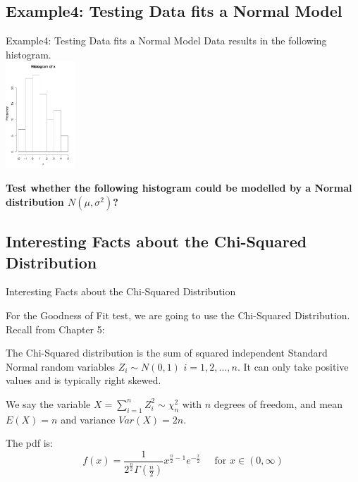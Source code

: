 \documentclass[t,xcolor=pdftex,dvipsnames,table]{beamer}
\begin{document}
\subsection[GoodnessofFit]{Example4: Testing Data fits a Normal Model}
\begin{frame}[fragile]{Example4: Testing Data fits a Normal Model}
Data results in the following histogram. \\



\includegraphics[height=4cm]{../images/Topic11_Q2.pdf}

\vspace{.5cm}
{\bf Test whether the following histogram could be modelled by a Normal distribution $N(\mu, \sigma^2)$?}
\end{frame}

\subsection[GoodnessofFit]{Interesting Facts about the Chi-Squared Distribution}

\begin{frame}[fragile]{Interesting Facts about the Chi-Squared Distribution}

For the Goodness of Fit test, we are going to use the 
Chi-Squared Distribution. Recall from Chapter 5:

\begin{definition}
The \alert{Chi-Squared distribution} is the sum of squared independent Standard Normal random variables $Z_{i} \sim N(0,1)$ $i=1,2,\ldots,n$. It can only take positive values and is typically right skewed.

\vspace{.5cm}
We say the variable $X = \sum_{i=1}^{n} Z_{i}^2 \sim \chi^2_{n}$ with $n$ degrees of freedom, and mean $E(X)=n$ and  variance $Var(X) = 2n$.

\vspace{.5cm}
The pdf is:
\[ f(x)  =  \frac{ 1}  { 2^{\frac{n}{2}} \Gamma(\frac{n}{2})}
x^{\frac{n}{2}-1} e^{-\frac{x}{2}}
\;\;\;\;\; \mbox{for }  x \in (0, \infty) \]

\end{definition}
\href{https://www.youtube.com/watch?v=hcDb12fsbBU}{}

\end{frame}
\end{document}
